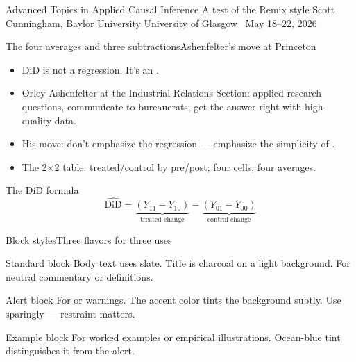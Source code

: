 \documentclass[aspectratio=169,11pt]{beamer}
\begin{document}
\remixtitleframe
  {Advanced Topics in Applied Causal Inference}
  {A test of the Remix style}
  {Scott Cunningham, Baylor University}
  {University of Glasgow \textperiodcentered\ May 18--22, 2026}


\begin{frame}{The four averages and three subtractions}{Ashenfelter's move at Princeton}
\begin{itemize}
  \item DiD is not a regression. It's an .
  \item Orley Ashenfelter at the Industrial Relations Section: applied research questions, communicate to bureaucrats, get the answer right with high-quality data.
  \item His move: don't emphasize the regression --- emphasize the simplicity of .
  \item The 2$\times$2 table: treated/control by pre/post; four cells; four averages.
\end{itemize}

\vspace{0.5em}

\begin{block}{The DiD formula}
\[
\widehat{\text{DiD}} = \underbrace{(Y_{11} - Y_{10})}_{\text{treated change}} - \underbrace{(Y_{01} - Y_{00})}_{\text{control change}}
\]
\end{block}
\end{frame}

\begin{frame}{Block styles}{Three flavors for three uses}
\begin{block}{Standard block}
Body text uses slate. Title is charcoal on a light background. For neutral commentary or definitions.
\end{block}

\begin{alertblock}{Alert block}
For  or warnings. The accent color tints the background subtly. Use sparingly --- restraint matters.
\end{alertblock}

\begin{exampleblock}{Example block}
For worked examples or empirical illustrations. Ocean-blue tint distinguishes it from the alert.
\end{exampleblock}
\end{frame}
\end{document}
